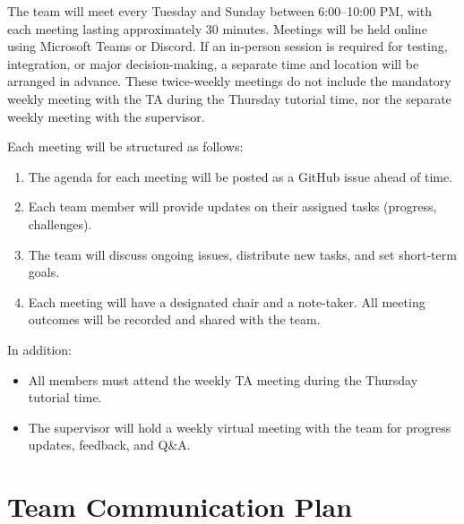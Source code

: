 \documentclass{article}
\begin{document}



The team will meet every Tuesday and Sunday between 6:00--10:00 PM, with each meeting lasting approximately 30 minutes. 
Meetings will be held online using Microsoft Teams or Discord. If an in-person session is required for testing, integration, or major 
decision-making, a separate time and location will be arranged in advance. These twice-weekly meetings do not include 
the mandatory weekly meeting with the TA during the Thursday tutorial time, nor the separate weekly meeting with the supervisor.

Each meeting will be structured as follows:

\begin{enumerate}
    \item The agenda for each meeting will be posted as a GitHub issue ahead of time.
    \item Each team member will provide updates on their assigned tasks (progress, challenges).
    \item The team will discuss ongoing issues, distribute new tasks, and set short-term goals.
    \item Each meeting will have a designated chair and a note-taker. All meeting outcomes will be recorded and shared with the team.
\end{enumerate}

In addition:
\begin{itemize}
    \item All members must attend the weekly TA meeting during the Thursday tutorial time.
    \item The supervisor will hold a weekly virtual meeting with the team for progress updates, feedback, and Q\&A.
\end{itemize}





\section{Team Communication Plan}
\end{document}
